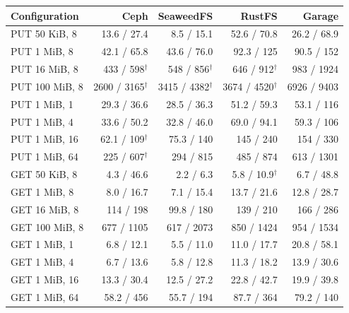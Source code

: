 \begin{tabular}{lrrrr}
\toprule
Configuration & Ceph & SeaweedFS & RustFS & Garage \\
\midrule
PUT 50 KiB, 8 & 13.6 / 27.4 & 8.5 / 15.1 & 52.6 / 70.8 & 26.2 / 68.9 \\
PUT 1 MiB, 8 & 42.1 / 65.8 & 43.6 / 76.0 & 92.3 / 125 & 90.5 / 152 \\
PUT 16 MiB, 8 & 433 / 598$^{\dagger}$ & 548 / 856$^{\dagger}$ & 646 / 912$^{\dagger}$ & 983 / 1924 \\
PUT 100 MiB, 8 & 2600 / 3165$^{\dagger}$ & 3415 / 4382$^{\dagger}$ & 3674 / 4520$^{\dagger}$ & 6926 / 9403 \\
\midrule
PUT 1 MiB, 1 & 29.3 / 36.6 & 28.5 / 36.3 & 51.2 / 59.3 & 53.1 / 116 \\
PUT 1 MiB, 4 & 33.6 / 50.2 & 32.8 / 46.0 & 69.0 / 94.1 & 59.3 / 106 \\
PUT 1 MiB, 16 & 62.1 / 109$^{\dagger}$ & 75.3 / 140 & 145 / 240 & 154 / 330 \\
PUT 1 MiB, 64 & 225 / 607$^{\dagger}$ & 294 / 815 & 485 / 874 & 613 / 1301 \\
\midrule
GET 50 KiB, 8 & 4.3 / 46.6 & 2.2 / 6.3 & 5.8 / 10.9$^{\dagger}$ & 6.7 / 48.8 \\
GET 1 MiB, 8 & 8.0 / 16.7 & 7.1 / 15.4 & 13.7 / 21.6 & 12.8 / 28.7 \\
GET 16 MiB, 8 & 114 / 198 & 99.8 / 180 & 139 / 210 & 166 / 286 \\
GET 100 MiB, 8 & 677 / 1105 & 617 / 2073 & 850 / 1424 & 954 / 1534 \\
\midrule
GET 1 MiB, 1 & 6.8 / 12.1 & 5.5 / 11.0 & 11.0 / 17.7 & 20.8 / 58.1 \\
GET 1 MiB, 4 & 6.7 / 13.6 & 5.8 / 12.8 & 11.3 / 18.2 & 13.9 / 30.6 \\
GET 1 MiB, 16 & 13.3 / 30.4 & 12.5 / 27.2 & 22.8 / 42.7 & 19.9 / 39.8 \\
GET 1 MiB, 64 & 58.2 / 456 & 55.7 / 194 & 87.7 / 364 & 79.2 / 140 \\
\bottomrule
\end{tabular}
